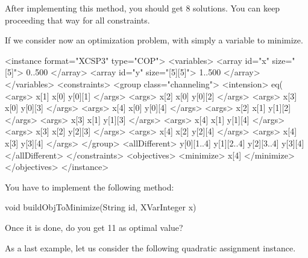 \documentclass[10pt]{article}
\newenvironment{boxabsc}
               {\medskip \begin{bclogo}[barre=none,arrondi=0.2,logo=]{}\vspace{-0.6cm}}
               {\vspace{-0.1cm}\end{bclogo} \smallskip}
\begin{document}
After implementing this method, you should get 8 solutions.
You can keep proceeding that way for all constraints.

If we consider now an optimization problem, with simply a variable to minimize.

\begin{boxabsc}
\begin{absc}
<instance format="XCSP3" type="COP">
  <variables>
    <array id="x" size="[5]"> 0..500 </array>
    <array id="y" size="[5][5]"> 1..500 </array>
  </variables>
  <constraints>
    <group class="channeling">
      <intension> eq(%
      <args> x[1] x[0] y[0][1] </args>
      <args> x[2] x[0] y[0][2] </args>
      <args> x[3] x[0] y[0][3] </args>
      <args> x[4] x[0] y[0][4] </args>
      <args> x[2] x[1] y[1][2] </args>
      <args> x[3] x[1] y[1][3] </args>
      <args> x[4] x[1] y[1][4] </args>
      <args> x[3] x[2] y[2][3] </args>
      <args> x[4] x[2] y[2][4] </args>
      <args> x[4] x[3] y[3][4] </args>
    </group>
    <allDifferent> y[0][1..4] y[1][2..4] y[2][3..4] y[3][4] </allDifferent>
  </constraints>
  <objectives>
    <minimize> x[4] </minimize>
  </objectives>
</instance>
\end{absc} 
\end{boxabsc}


You have to implement the following method:

\begin{boxabsc}
\begin{absc}
void buildObjToMinimize(String id, XVarInteger x) 
\end{absc} 
\end{boxabsc}

Once it is done, do you get 11 as optimal value?

As a last example, let us consider the following quadratic assignment instance.
\end{document}
